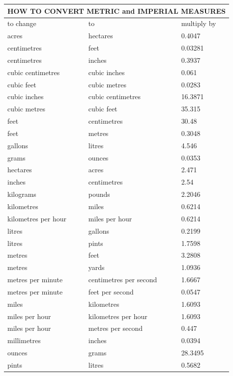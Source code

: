 \documentclass[10pt]{article}
\begin{document}
\begin{center}
\begin{tabular}{|l|l|l|}
\hline
\multicolumn{3}{|c|}{HOW TO CONVERT METRIC and IMPERIAL MEASURES} \\
\hline
to change & to & multiply by \\
\hline
acres & hectares & 0.4047 \\
\hline
centimetres & feet & 0.03281 \\
\hline
centimetres & inches & 0.3937 \\
\hline
cubic centimetres & cubic inches & 0.061 \\
\hline
cubic feet & cubic metres & 0.0283 \\
\hline
cubic inches & cubic centimetres & 16.3871 \\
\hline
cubic metres & cubic feet & 35.315 \\
\hline
feet & centimetres & 30.48 \\
\hline
feet & metres & 0.3048 \\
\hline
gallons & litres & 4.546 \\
\hline
grams & ounces & 0.0353 \\
\hline
hectares & acres & 2.471 \\
\hline
inches & centimetres & 2.54 \\
\hline
kilograms & pounds & 2.2046 \\
\hline
kilometres & miles & 0.6214 \\
\hline
kilometres per hour & miles per hour & 0.6214 \\
\hline
litres & gallons & 0.2199 \\
\hline
litres & pints & 1.7598 \\
\hline
metres & feet & 3.2808 \\
\hline
metres & yards & 1.0936 \\
\hline
metres per minute & centimetres per second & 1.6667 \\
\hline
metres per minute & feet per second & 0.0547 \\
\hline
miles & kilometres & 1.6093 \\
\hline
miles per hour & kilometres per hour & 1.6093 \\
\hline
miles per hour & metres per second & 0.447 \\
\hline
millimetres & inches & 0.0394 \\
\hline
ounces & grams & 28.3495 \\
\hline
pints & litres & 0.5682 \\
\hline

\end{tabular}
\end{center}
\end{document}
